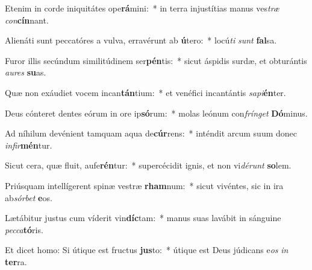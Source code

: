 \item Etenim in corde iniquitátes ope\textbf{rá}mini:~* in terra injustítias manus ves\textit{træ} \textit{con}\textbf{cín}nant.
\item Alienáti sunt peccatóres a vulva, erravérunt ab \textbf{ú}tero:~* locú\textit{ti} \textit{sunt} \textbf{fal}sa.
\item Furor illis secúndum similitúdinem ser\textbf{pén}tis:~* sicut áspidis surdæ, et obturántis \textit{au}\textit{res} \textbf{su}as.
\item Quæ non exáudiet vocem incan\textbf{tán}tium:~* et venéfici incantántis \textit{sa}\textit{pi}\textbf{én}ter.
\item Deus cónteret dentes eórum in ore ip\textbf{só}rum:~* molas leónum con\textit{frín}\textit{get} \textbf{Dó}minus.
\item Ad níhilum devénient tamquam aqua de\textbf{cúr}rens:~* inténdit arcum suum donec \textit{in}\textit{fir}\textbf{mén}tur.
\item Sicut cera, quæ fluit, aufe\textbf{rén}tur:~* supercécidit ignis, et non vi\textit{dé}\textit{runt} \textbf{so}lem.
\item Priúsquam intellígerent spinæ vestræ \textbf{rham}num:~* sicut vivéntes, sic in ira ab\textit{sór}\textit{bet} \textbf{e}os.
\item Lætábitur justus cum víderit vin\textbf{díc}tam:~* manus suas lavábit in sánguine \textit{pec}\textit{ca}\textbf{tó}ris.
\item Et dicet homo: Si útique est fructus \textbf{jus}to:~* útique est Deus júdicans e\textit{os} \textit{in} \textbf{ter}ra.

